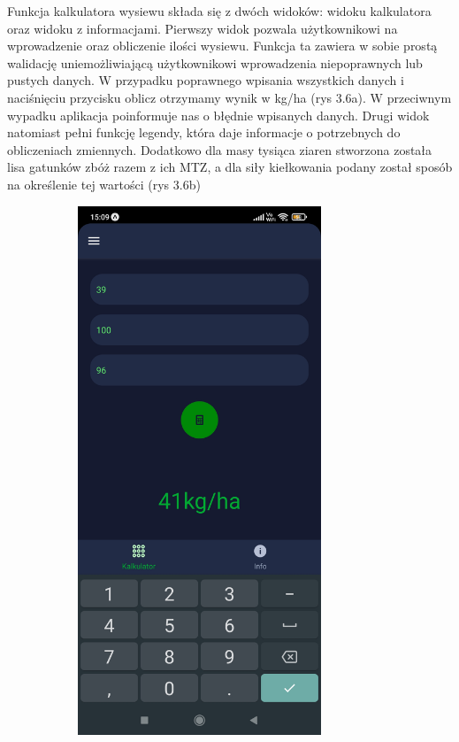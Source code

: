 \documentclass[a4paper,12pt,oneside]{book}
\begin{document}
	Funkcja kalkulatora wysiewu składa się z dwóch widoków: widoku kalkulatora oraz widoku z informacjami. Pierwszy widok pozwala użytkownikowi na wprowadzenie oraz obliczenie ilości wysiewu. Funkcja ta zawiera w sobie prostą walidację uniemożliwiającą użytkownikowi wprowadzenia niepoprawnych lub pustych danych. W przypadku poprawnego wpisania wszystkich danych i naciśnięciu przycisku oblicz otrzymamy wynik w kg/ha (rys 3.6a). W przeciwnym wypadku aplikacja poinformuje nas o błędnie wpisanych danych.  Drugi widok natomiast pełni funkcję legendy, która daje informacje o potrzebnych do obliczeniach zmiennych. Dodatkowo dla masy tysiąca ziaren stworzona została lisa gatunków zbóż razem z ich MTZ, a dla siły kiełkowania podany został sposób na określenie tej wartości (rys 3.6b)
	
	\begin{figure}[H]
		\centering
		\begin{subfigure}{.5\textwidth}
			\centering
			\includegraphics[width=0.8\textwidth]{grafika/kal_a.jpg}

\end{subfigure}
\end{figure}
\end{document}

